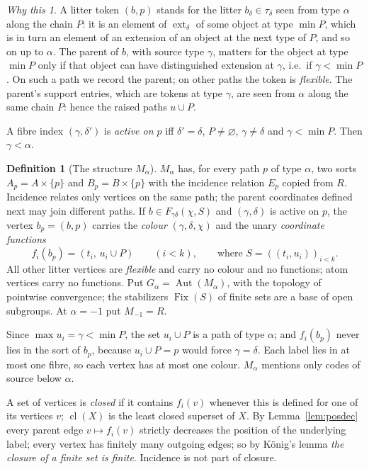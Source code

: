 \documentclass[11pt]{article}
\theoremstyle{definition}
\newtheorem{definition}[theorem]{Definition}
\theoremstyle{remark}
\newtheorem*{idea}{Why this}
\newcommand{\Aut}{\operatorname{Aut}}
\newcommand{\Fix}{\operatorname{Fix}}
\newcommand{\cl}{\operatorname{cl}}
\newcommand{\ext}{\operatorname{ext}}
\begin{document}
\begin{idea}
A litter token \((b,p)\) stands for the litter \(b_\delta\in\tau_\delta\)
seen from type \(\alpha\) along the chain \(P\): it is an element of
\(\ext_\delta\) of some object at type \(\min P\), which is in turn an
element of an extension of an object at the next type of \(P\), and so on
up to \(\alpha\). The parent of \(b\), with source type \(\gamma\), matters
for the object at type \(\min P\) only if that object can have
distinguished extension at \(\gamma\), i.e.\ if \(\gamma<\min P\). On such
a path we record the parent; on other paths the token is \emph{flexible}.
The parent's support entries, which are tokens at type \(\gamma\), are
seen from \(\alpha\) along the same chain \(P\): hence the raised paths
\(u\cup P\).
\end{idea}

A fibre index \((\gamma,\delta')\) is \emph{active on \(p\)} iff
\(\delta'=\delta\), \(P\neq\varnothing\), \(\gamma\neq\delta\) and
\(\gamma<\min P\). Then \(\gamma<\alpha\).

\begin{definition}[The structure \(M_\alpha\)]
\(M_\alpha\) has, for every path \(p\) of type \(\alpha\), two sorts
\(A_p=A\times\{p\}\) and \(B_p=B\times\{p\}\) with the incidence relation
\(E_p\) copied from \(R\). Incidence relates only vertices on the same
path; the parent coordinates defined next may join different paths.
If \(b\in F_{\gamma\delta}(\chi,S)\) and \((\gamma,\delta)\) is active on
\(p\), the vertex \(b_p=(b,p)\) carries the \emph{colour}
\((\gamma,\delta,\chi)\) and the unary \emph{coordinate functions}
\[
 f_i(b_p)=(t_i,\,u_i\cup P)\qquad(i<k),\qquad\text{where }S=((t_i,u_i))_{i<k}.
\]
All other litter vertices are \emph{flexible} and carry no colour and no
functions; atom vertices carry no functions. Put \(G_\alpha=\Aut(M_\alpha)
\), with the topology of pointwise convergence; the stabilizers
\(\Fix(S)\) of finite sets are a base of open subgroups. At \(\alpha=-1\)
put \(M_{-1}=R\).
\end{definition}

Since \(\max u_i=\gamma<\min P\), the set \(u_i\cup P\) is a path of type
\(\alpha\); and \(f_i(b_p)\) never lies in the sort of \(b_p\), because
\(u_i\cup P=p\) would force \(\gamma=\delta\). Each label lies in at most
one fibre, so each vertex has at most one colour. \(M_\alpha\) mentions
only codes of source below \(\alpha\).

A set of vertices is \emph{closed} if it contains \(f_i(v)\) whenever
this is defined for one of its vertices \(v\); \(\cl(X)\) is the least
closed superset of \(X\). By Lemma~\ref{lem:posdec} every parent edge
\(v\mapsto f_i(v)\) strictly decreases the position of the underlying
label; every vertex has finitely many outgoing edges; so by K\"onig's lemma
\emph{the closure of a finite set is finite}. Incidence is not part of
closure.
\end{document}
